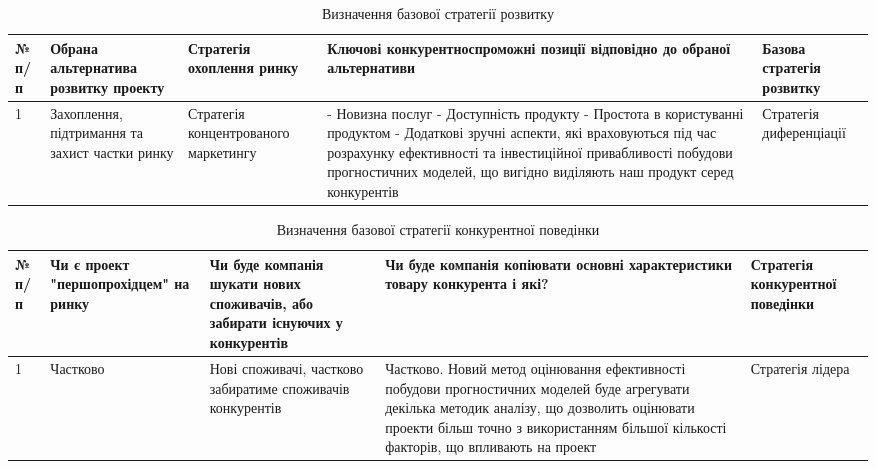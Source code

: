\begin{table}[h!]
\fontsize{12pt}{12pt}\selectfont
	\begin{tabularx}{\textwidth}{|l|X|X|X|X|}
    \hline
    № п/п & Обрана альтернатива розвитку проекту & Стратегія охоплення ринку & Ключові конкурентноспроможні позиції відповідно до обраної альтернативи & Базова стратегія розвитку \\ \hline
    1 & Захоплення, підтримання та захист частки ринку & Стратегія концентрованого маркетингу & - Новизна послуг
    - Доступність продукту
    - Простота в користуванні продуктом
    - Додаткові зручні аспекти, які враховуються під час розрахунку ефективності та інвестиційної привабливості побудови прогностичних моделей, що вигідно виділяють наш продукт серед конкурентів & Стратегія диференціації \\
    \hline
    \end{tabularx}
\caption{Визначення базової стратегії розвитку} \label{tab:stab_11}
\end{table}

\begin{table}[h!]
\fontsize{12pt}{12pt}\selectfont
	\begin{tabularx}{\textwidth}{|l|X|X|X|X|}
    \hline
    № п/п & Чи є проект "першопрохідцем" на ринку & Чи буде компанія шукати нових споживачів, або забирати існуючих у конкурентів & Чи буде компанія копіювати основні характеристики товару конкурента і які? & Стратегія конкурентної поведінки \\ \hline
    1 & Частково & Нові споживачі, частково забиратиме споживачів конкурентів & Частково. Новий метод оцінювання ефективності побудови прогностичних моделей буде агрегувати декілька методик аналізу, що дозволить оцінювати проекти більш точно з використанням більшої кількості факторів, що впливають на проект & Стратегія лідера \\
    \hline
    \end{tabularx}
\caption{Визначення базової стратегії конкурентної поведінки} \label{tab:stab_12}
\end{table}

